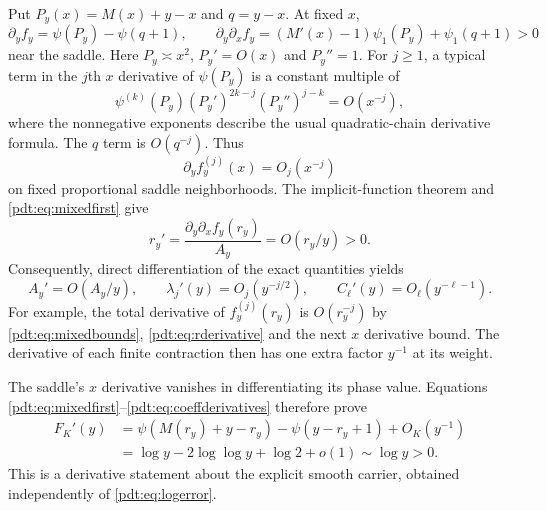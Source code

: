 Put $P_y(x)=M(x)+y-x$ and $q=y-x$. At fixed $x$,
\begin{equation}\label{pdt:eq:mixedfirst}
 \partial_y f_y=\psi(P_y)-\psi(q+1),\qquad
 \partial_y\partial_x f_y=(M'(x)-1)\psi_1(P_y)+\psi_1(q+1)>0
\end{equation}
near the saddle. Here $P_y\asymp x^2$, $P_y'=O(x)$ and $P_y''=1$. For $j\ge1$, a typical term in the $j$th $x$ derivative of $\psi(P_y)$ is a constant multiple of
\[
 \psi^{(k)}(P_y)(P_y')^{2k-j}(P_y'')^{j-k}=O(x^{-j}),
\]
where the nonnegative exponents describe the usual quadratic-chain derivative formula. The $q$ term is $O(q^{-j})$. Thus
\begin{equation}\label{pdt:eq:mixedbounds}
 \partial_y f_y^{(j)}(x)=O_j(x^{-j})
\end{equation}
on fixed proportional saddle neighborhoods. The implicit-function theorem and \eqref{pdt:eq:mixedfirst} give
\begin{equation}\label{pdt:eq:rderivative}
 r_y'=\frac{\partial_y\partial_x f_y(r_y)}{A_y}
       =O(r_y/y)>0.
\end{equation}
Consequently, direct differentiation of the exact quantities yields
\begin{equation}\label{pdt:eq:coeffderivatives}
 A_y'=O(A_y/y),\qquad
 \lambda_j'(y)=O_j(y^{-j/2}),\qquad
 C_\ell'(y)=O_\ell(y^{-\ell-1}).
\end{equation}
For example, the total derivative of $f_y^{(j)}(r_y)$ is $O(r_y^{-j})$ by \eqref{pdt:eq:mixedbounds}, \eqref{pdt:eq:rderivative} and the next $x$ derivative bound. The derivative of each finite contraction then has one extra factor $y^{-1}$ at its weight.

The saddle's $x$ derivative vanishes in differentiating its phase value. Equations \eqref{pdt:eq:mixedfirst}--\eqref{pdt:eq:coeffderivatives} therefore prove
\begin{equation}\label{pdt:eq:Fslope}
 \begin{split}
 F_K'(y)&=\psi(M(r_y)+y-r_y)-\psi(y-r_y+1)+O_K(y^{-1})\\
 &=\log y-2\log\log y+\log2+o(1)\sim\log y>0.
 \end{split}
\end{equation}
This is a derivative statement about the explicit smooth carrier, obtained independently of \eqref{pdt:eq:logerror}.

